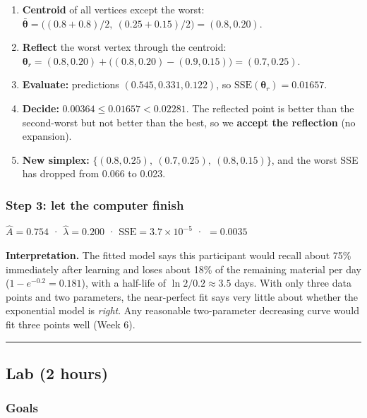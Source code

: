 \begin{enumerate}
\def\labelenumi{\arabic{enumi}.}
\tightlist
\item
  \textbf{Centroid} of all vertices except the worst:
  \(\bar{\boldsymbol\theta} = \big((0.8 + 0.8)/2,\ (0.25 + 0.15)/2\big) = (0.8, 0.20)\).
\item
  \textbf{Reflect} the worst vertex through the centroid:
  \(\boldsymbol\theta_r = (0.8, 0.20) + \big((0.8, 0.20) - (0.9, 0.15)\big) = (0.7, 0.25)\).
\item
  \textbf{Evaluate:} predictions \((0.545, 0.331, 0.122)\), so
  \(\mathrm{SSE}(\boldsymbol\theta_r) = 0.01657\).
\item
  \textbf{Decide:} \(0.00364 \le 0.01657 < 0.02281\). The reflected
  point is better than the second-worst but not better than the best, so
  we \textbf{accept the reflection} (no expansion).
\item
  \textbf{New simplex:} \(\{(0.8, 0.25),\ (0.7, 0.25),\ (0.8, 0.15)\}\),
  and the worst SSE has dropped from 0.066 to 0.023.
\end{enumerate}

\subsubsection{Step 3: let the computer finish}

\(\hat A = 0.754\) · \(\hat\lambda = 0.200\) ·
\(\mathrm{SSE} = 3.7 \times 10^{-5}\) · \(= 0.0035\)

\textbf{Interpretation.} The fitted model says this participant would
recall about 75\% immediately after learning and loses about 18\% of the
remaining material per day (\(1 - e^{-0.2} = 0.181\)), with a half-life
of \(\ln 2 / 0.2 \approx 3.5\) days. With only three data points and two
parameters, the near-perfect fit says very little about whether the
exponential model is \emph{right}. Any reasonable two-parameter
decreasing curve would fit three points well (Week 6).

\begin{center}\rule{0.5\linewidth}{0.5pt}\end{center}


\subsection{Lab (2 hours)}

\subsubsection{Goals}

